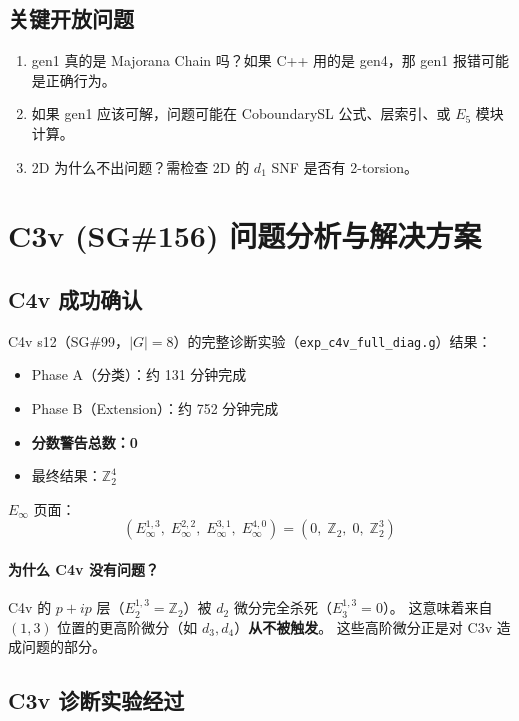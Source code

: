 \documentclass[a4paper,fontset=ubuntu,12pt]{ctexart}
\begin{document}
\subsection{关键开放问题}
\begin{enumerate}
\item gen1 真的是 Majorana Chain 吗？如果 C++ 用的是 gen4，那 gen1 报错可能是正确行为。
\item 如果 gen1 应该可解，问题可能在 CoboundarySL 公式、层索引、或 $E_5$ 模块计算。
\item 2D 为什么不出问题？需检查 2D 的 $d_1$ SNF 是否有 2-torsion。
\end{enumerate}


\section{C3v (SG\#156) 问题分析与解决方案}
\label{sec:c3v-analysis}

\subsection{C4v 成功确认}

C4v s12（SG\#99，$|G|=8$）的完整诊断实验（\texttt{exp\_c4v\_full\_diag.g}）结果：
\begin{itemize}
\item Phase A（分类）：约 131 分钟完成
\item Phase B（Extension）：约 752 分钟完成
\item \textbf{分数警告总数：0}
\item 最终结果：$\mathbb{Z}_2^4$
\end{itemize}

$E_\infty$ 页面：
\begin{equation}
(E_\infty^{1,3},\; E_\infty^{2,2},\; E_\infty^{3,1},\; E_\infty^{4,0})
= (0,\; \mathbb{Z}_2,\; 0,\; \mathbb{Z}_2^3)
\end{equation}

\paragraph{为什么 C4v 没有问题？}
C4v 的 $p{+}ip$ 层（$E_2^{1,3} = \mathbb{Z}_2$）被 $d_2$ 微分完全杀死（$E_3^{1,3} = 0$）。
这意味着来自 $(1,3)$ 位置的更高阶微分（如 $d_3, d_4$）\textbf{从不被触发}。
这些高阶微分正是对 C3v 造成问题的部分。

\subsection{C3v 诊断实验经过}
\end{document}
